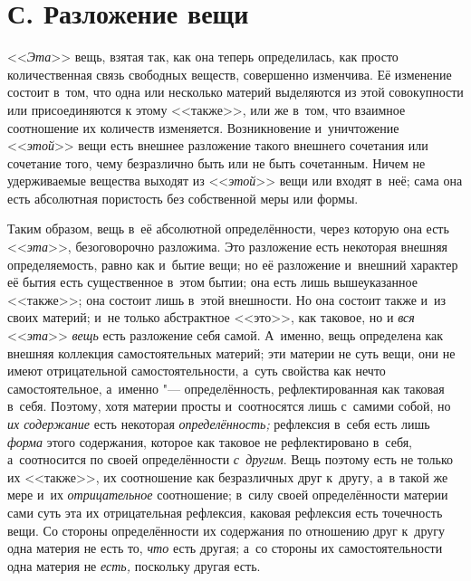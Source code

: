 \section[С. Разложение вещи]{С. Разложение вещи}

<<{\em Эта}>> вещь, взятая
так, как она теперь определилась, как просто количественная связь свободных
веществ, совершенно изменчива. Её изменение состоит в~том, что одна или
несколько материй выделяются из этой совокупности или присоединяются к
этому <<также>>, или же в~том, что взаимное соотношение их количеств
изменяется. Возникновение и~уничтожение <<{\em этой}>>
вещи есть внешнее разложение такого внешнего сочетания или сочетание того,
чему безразлично быть или не быть сочетанным. Ничем не удерживаемые
вещества выходят из <<{\em этой}>> вещи или входят в~неё;
сама она есть абсолютная пористость без собственной меры или формы.

Таким образом, вещь в~её абсолютной определённости, через которую она есть
<<{\em эта}>>, безоговорочно разложима. Это разложение
есть некоторая внешняя определяемость, равно как и~бытие вещи; но её
разложение и~внешний характер её бытия есть существенное в~этом бытии; она
есть лишь вышеуказанное <<также>>; она состоит лишь в~этой внешности. Но она
состоит также и~из своих материй; и~не только абстрактное <<это>>, как
таковое, но и {\em вся}
<<{\em эта}>> {\em вещь} есть
разложение себя самой. А~именно, вещь определена как внешняя коллекция
самостоятельных материй; эти материи не суть вещи, они не имеют
отрицательной самостоятельности, а~суть свойства как нечто самостоятельное,
а~именно "--- определённость, рефлектированная как таковая в~себя. Поэтому,
хотя материи просты и~соотносятся лишь с~самими собой, но
{\em их содержание} есть некоторая
{\em определённость;} рефлексия в~себя есть лишь
{\em форма} этого содержания, которое как таковое не
рефлектировано в~себя, а~соотносится по своей определённости
{\em с~другим}. Вещь поэтому есть не только их <<также>>,
их соотношение как безразличных друг к~другу, а~в такой же мере и~их
{\em отрицательное} соотношение; в~силу своей
определённости материи сами суть эта их отрицательная рефлексия, каковая
рефлексия есть точечность вещи. Со стороны определённости их содержания по
отношению друг к~другу одна материя не есть то,
{\em что} есть другая; а~со стороны их
самостоятельности одна материя не {\em есть,} поскольку другая есть.

